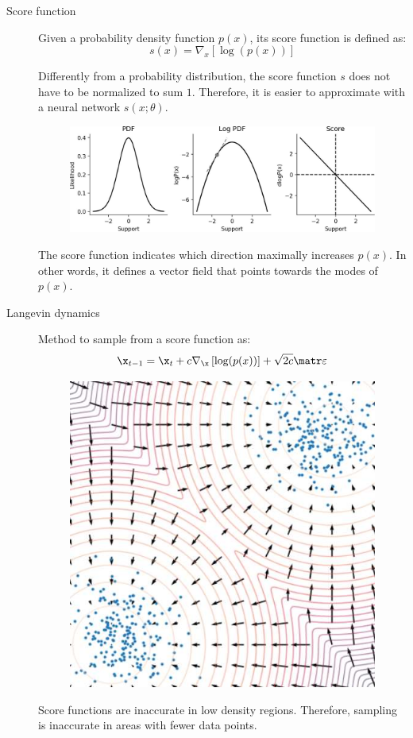 \begin{description}
    \item[Score function] 
        Given a probability density function $p(x)$, its score function is defined as:
        \[ s(x) = \nabla_x\left[ \log(p(x)) \right] \]

        \begin{remark}
            Differently from a probability distribution, the score function $s$ does not have to be normalized to sum $1$. Therefore, it is easier to approximate with a neural network $s(x; \theta)$.
        \end{remark}

        \begin{figure}[H]
            \centering
            \includegraphics[width=0.65\linewidth]{./img/score_function.jpg}
        \end{figure}

        The score function indicates which direction maximally increases $p(x)$. In other words, it defines a vector field that points towards the modes of $p(x)$.

    \item[Langevin dynamics] 
        Method to sample from a score function as:
        \[ \x_{t-1} = \x_t + c \nabla_\x\left[ \log(p(x)) \right] + \sqrt{2c} \noise \]

        \begin{figure}[H]
            \centering
            \includegraphics[width=0.3\linewidth]{./img/langevin_dynamics.jpg}
        \end{figure}

        \begin{remark}
            Score functions are inaccurate in low density regions. Therefore, sampling is inaccurate in areas with fewer data points.


\end{remark}
\end{description}
